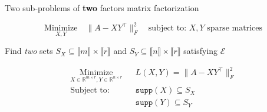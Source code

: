 \documentclass{beamer}
\newcommand\intset[1]{\llbracket #1 \rrbracket}
\newcommand{\mc}[1]{\mathcal{#1}}
\newcommand{\mb}[1]{\mathbb{#1}}
\begin{document}
\begin{frame}{Two sub-problems of \textbf{two} factors matrix factorization}
	\begin{tcolorbox}[top=0pt,bottom=0pt]
		\setlength{\abovedisplayskip}{0pt}
		\begin{equation*}
			\label{eq:sparse_recovery1}
			\underset{X, Y}{\text{Minimize}} \quad \|A - XY^\top\|_F^2  \quad	\text{subject to: } X, Y \text{  sparse matrices} 
		\end{equation*}
	\end{tcolorbox}
	
	
	
	\begin{tcolorbox}[title = \text{1) Support identification}, colframe =  red!50!yellow, colbacktitle= red!50!yellow]
		Find \emph{two} sets $S_X \subseteq \intset{m} \times \intset{r}$ and $S_Y \subseteq \intset{n} \times \intset{r}$ satisfying  $\mc{E}$ 	\end{tcolorbox}
	
		\begin{tcolorbox}[title = \text{2) Optimize coefficients inside support}, colframe =  red!70!yellow, colbacktitle= red!70!yellow]
			\setlength{\abovedisplayskip}{0pt}
			\begin{equation*}\tag{FSMF}
				\begin{aligned}
					& \underset{X \in \mb{R}^{m \times r}, Y \in \mb{R}^{n \times r}}{\text{Minimize}} 
					& &L(X, Y) = \|A - XY^\top\|_F^2&\\
					& \text{Subject to: }
					& &\texttt{supp}(X) \subseteq S_X&\\
					& & &\texttt{supp}(Y) \subseteq S_Y&\\
				\end{aligned}
			\end{equation*}
		\end{tcolorbox}
	
\end{frame}

		
				
\end{document}
